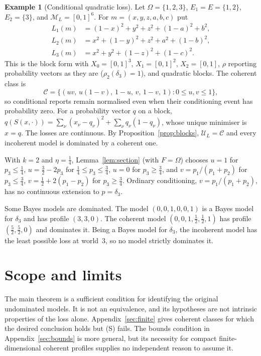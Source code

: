 \documentclass[11pt]{article}
\theoremstyle{definition}
\newtheorem{example}[theorem]{Example}
\theoremstyle{remark}
\newcommand{\M}{\mathcal M}
\newcommand{\C}{\mathcal C}
\newcommand{\U}{\mathcal U}
\begin{document}
\begin{example}[Conditional quadratic loss]\label{ex:conditional}
Let $\Omega=\{1,2,3\}$, $E_1=E=\{1,2\}$, $E_2=\{3\}$, and $\M_L=[0,1]^6$. For $m=(x,y,z,a,b,c)$ put
\[
\begin{aligned}
 L_1(m)&=(1-x)^2+y^2+z^2+(1-a)^2+b^2,\\
 L_2(m)&=x^2+(1-y)^2+z^2+a^2+(1-b)^2,\\
 L_3(m)&=x^2+y^2+(1-z)^2+(1-c)^2.
\end{aligned}
\]
This is the block form with $X_0=[0,1]^3$, $X_1=[0,1]^2$, $X_2=[0,1]$, $\rho$ reporting probability vectors as they are ($\rho_2(\delta_3)=1$), and quadratic blocks. The coherent class is
\[
 \C=\{(uv,\,u(1-v),\,1-u,\,v,\,1-v,\,1):0\le u,v\le1\},
\]
so conditional reports remain normalised even when their conditioning event has probability zero. For a probability vector $q$ on a block, $q(S(x,\cdot))=\sum_\nu(x_\nu-q_\nu)^2+\sum_\nu q_\nu(1-q_\nu)$, whose unique minimiser is $x=q$. The losses are continuous. By Proposition~\ref{prop:blocks}, $\U_L=\C$ and every incoherent model is dominated by a coherent one.

With $k=2$ and $\eta=\tfrac14$, Lemma~\ref{lem:section} (with $F=\Omega$) chooses $u=1$ for $p_3\le\tfrac14$, $u=\tfrac32-2p_3$ for $\tfrac14\le p_3\le\tfrac34$, $u=0$ for $p_3\ge\tfrac34$, and $v=p_1/(p_1+p_2)$ for $p_3\le\tfrac34$, $v=\tfrac12+2(p_1-p_2)$ for $p_3\ge\tfrac34$. Ordinary conditioning, $v=p_1/(p_1+p_2)$, has no continuous extension to $p=\delta_3$.

Some Bayes models are dominated. The model $(0,0,1,0,0,1)$ is a Bayes model for $\delta_3$ and has profile $(3,3,0)$. The coherent model $(0,0,1,\tfrac12,\tfrac12,1)$ has profile $(\tfrac52,\tfrac52,0)$ and dominates it. Being a Bayes model for $\delta_3$, the incoherent model has the least possible loss at world~$3$, so no model strictly dominates it.
\end{example}


\section{Scope and limits}\label{sec:scope}
The main theorem is a sufficient condition for identifying the original undominated models. It is not an equivalence, and its hypotheses are not intrinsic properties of the loss alone. Appendix~\ref{sec:finite} gives coherent classes for which the desired conclusion holds but (S) fails. The bounds condition in Appendix~\ref{sec:bounds} is more general, but its necessity for compact finite-dimensional coherent profiles supplies no independent reason to assume it.
\end{document}
